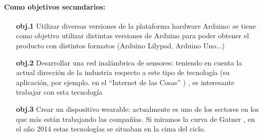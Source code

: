 \paragraph{
Como objetivos secundarios:
}
  \begin{itemize}
    \item[\textbf{obj.1}]Utilizar diversas versiones de la plataforma hardware Arduino: se tiene como objetivo utilizar distintas versiones de Arduino para poder obtener el producto con distintos formatos (Arduino Lilypad, Arduino Uno...)
    \item[\textbf{obj.2}]Desarrollar una red inalámbrica de sensores: teniendo en cuenta la actual dirección de la industria respecto a este tipo de tecnología (su aplicación, por ejemplo. en el “Internet de las Cosas” \cite{hypeIoT} \cite{gatnercurve}) , es interesante trabajar con esta tecnología
    \item[\textbf{obj.3}]Crear un dispositivo wearable: actualmente es uno de los sectores en los que más están trabajando las compañías. Si miramos la curva de Gatner \cite{gatnercurve}, en el año 2014 estas tecnologías se situaban en la cima del ciclo.
  \end{itemize}
